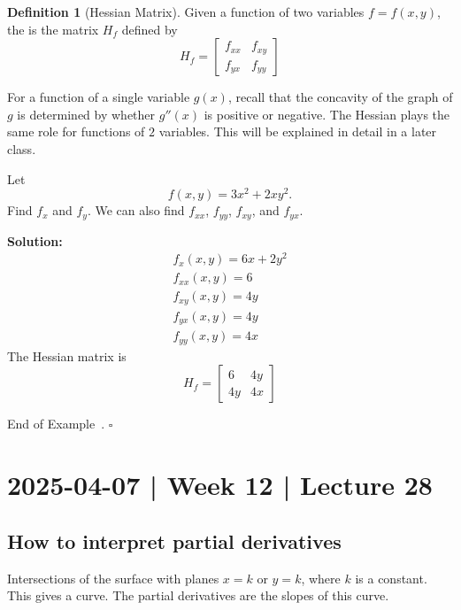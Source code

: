 \documentclass[10pt]{article}
\theoremstyle{definition}
\newtheorem{definition}[theorem]{Definition}
\newtheorem{example}[theorem]{Example}
\renewenvironment{example}
{\begin{oldexample}}
  {\par\smallskip\hfill   End of Example~\theexample. $\square$    \par\end{oldexample}}
\newcommand{\fl}{\noindent\textbf} %
\newcommand{\1}[1]{\textbf{1}_{\left[#1\right]}} %
\newcommand{\dempfcolor}[1]{{\color{RoyalBlue}#1}}
\newcommand{\demph}[1]{\dempfcolor{{\sl #1}}}
\begin{document}
\begin{definition}[Hessian Matrix]
  Given a function of two variables $f=f(x,y)$, the \demph{Hessian matrix} is
  the matrix $H_{f}$ defined by
  \begin{equation*}
    H_{f} = \begin{bmatrix}
      f_{xx}&f_{xy}\\
      f_{yx}&f_{yy}
    \end{bmatrix}
  \end{equation*}
\end{definition}

For a function of a single variable $g(x)$, recall that the concavity of the
graph of $g$ is determined by whether $g''(x)$ is positive or negative. The
Hessian plays the same role for functions of $2$ variables. This will be
explained in detail in a later class.

\begin{example}
  Let
  \begin{equation*}
    f(x,y) = 3x^{2}+2xy^{2}.
  \end{equation*}
  Find $f_{x}$ and $f_{y}$. We can also find $f_{xx}$, $f_{yy}$, $f_{xy}$, and
  $f_{yx}$.

  \fl{Solution:}
  \begin{gather*}
    f_{x}(x,y) = 6x+2y^{2}\\
    f_{xx}(x,y) = 6\\
    f_{xy}(x,y) = 4y\\
    f_{yx}(x,y) = 4y\\
    f_{yy}(x,y) = 4x
  \end{gather*}
  The Hessian matrix is
  \begin{equation*}
    H_{f} =
    \begin{bmatrix}
      6&4y\\
      4y&4x
    \end{bmatrix}
  \end{equation*}
\end{example}

\newpage

\section{2025-04-07 | Week 12 | Lecture 28}
\subsection{How to interpret partial derivatives}
Intersections of the surface with planes $x=k$ or $y=k$, where $k$ is a constant.
This gives a curve. The partial derivatives are the slopes of this curve.
\end{document}

